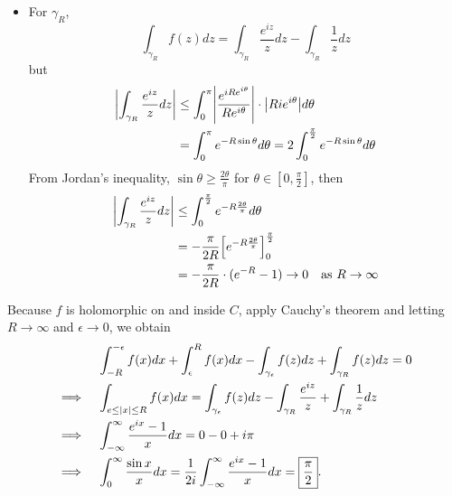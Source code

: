 \begin{solution}
\begin{itemize}
    
  \item For $\gamma_R$,
    \[
      \int_{\gamma_R}f(z)dz = \int_{\gamma_R}\frac{e^{iz}}{z}dz - \int_{\gamma_R}\frac1{z}dz
    \]
    but
    \begin{align*}
    	\abs*{\int_{\gamma_R}\frac{e^{iz}}{z}dz}
      &\leq \int_{0}^{\pi}\abs*{
        \frac{e^{iRe^{i\theta}}}{Re^{i\theta}}}\cdot \abs*{Rie^{i\theta}}d\theta\\
      &=\int_0^\pi e^{-R\sin\theta}d \theta = 2\int_{0}^{\frac\pi 2}e^{-R\sin\theta}d \theta
    \end{align*}
    From Jordan's inequality, $\sin\theta\geq\frac{2\theta}{\pi}$
    for $\theta\in[0,\frac\pi 2]$, then
    \begin{align*}
    	\abs*{\int_{\gamma_R}\frac{e^{iz}}{z}dz}
      &\leq\int_0^{\frac\pi 2}e^{-R\frac{2\theta}\pi} d\theta\\
      &=-\frac{\pi}{2R}\Big[e^{-R\frac{2\theta}\pi}\Big]_{0}^{\frac\pi 2}\\
      &=-\frac{\pi}{2R}\cdot (e^{-R}-1)\to 0\quad\text{as } R\to\infty
    \end{align*}
  \end{itemize}
  Because $f$ is holomorphic on and inside $C$, apply Cauchy's theorem and letting
  $R\to\infty$ and $\epsilon\to 0$, we obtain
  \begin{align*}
  	&\int_{-R}^{-\epsilon}f(x)dx+\int_{\epsilon}^{R}f(x)dx
      - \int_{\gamma_\epsilon}f(z)dz + \int_{\gamma_R}f(z)dz = 0\\\implies\quad
    &\int_{e\leq\abs{x}\leq R}f(x)dx =
      \int_{\gamma_\epsilon}f(z)dz
      -\int_{\gamma_R}\frac{e^{iz}}{z}
      +\int_{\gamma_R}\frac1{z}dz\\\implies\quad
    &\int_{-\infty}^{\infty}\frac{e^{ix}-1}{x}dx = 0 - 0 + i\pi \\\implies\quad
    &\int_{0}^{\infty}\frac{\sin x}{x}dx = \frac1{2i}\int_{-\infty}^{\infty}\frac{e^{ix}-1}{x}dx
      = \boxed{\frac\pi 2}.
  \end{align*}
\end{solution}

